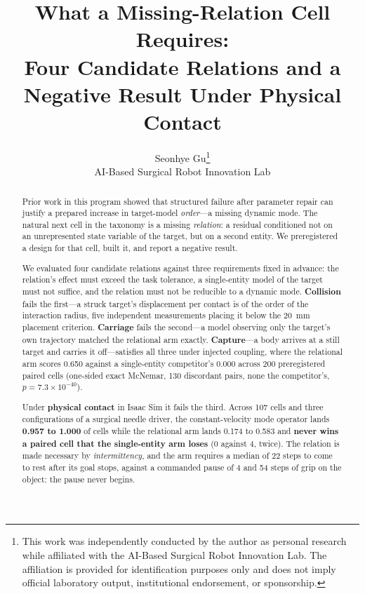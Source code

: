 \documentclass[10pt]{article}
\title{What a Missing-Relation Cell Requires:\\Four Candidate Relations and a Negative Result Under Physical Contact}
\author{Seonhye Gu\thanks{This work was independently conducted by the author as personal research while affiliated with the AI-Based Surgical Robot Innovation Lab. The affiliation is provided for identification purposes only and does not imply official laboratory output, institutional endorsement, or sponsorship.}\\
\small AI-Based Surgical Robot Innovation Lab}
\date{}
\newif\ifdraftnote
\begin{document}
\maketitle

\ifdraftnote
\begin{center}
\fbox{\parbox{0.92\textwidth}{\small\textbf{Draft note, not for submission.} The
bibliography has not been verified against published records. No confirmatory run
was performed: all physical evidence is calibration, and the preregistration
excludes calibration from confirmatory estimates. Section~\ref{sec:notclaimed}
states precisely which claims this record does and does not support. Remove this
box by setting \texttt{\textbackslash draftnotefalse}.}}
\end{center}
\fi

\begin{abstract}
Prior work in this program showed that structured failure after parameter repair
can justify a prepared increase in target-model \emph{order}---a missing dynamic
mode. The natural next cell in the taxonomy is a missing \emph{relation}: a
residual conditioned not on an unrepresented state variable of the target, but on
a second entity. We preregistered a design for that cell, built it, and report a
negative result.

We evaluated four candidate relations against three requirements fixed in
advance: the relation's effect must exceed the task tolerance, a single-entity
model of the target must not suffice, and the relation must not be reducible to a
dynamic mode. \textbf{Collision} fails the first---a struck target's displacement
per contact is of the order of the interaction radius, five independent
measurements placing it below the 20~mm placement criterion. \textbf{Carriage}
fails the second---a model observing only the target's own trajectory matched the
relational arm exactly. \textbf{Capture}---a body arrives at a still target and
carries it off---satisfies all three under injected coupling, where the
relational arm scores 0.650 against a single-entity competitor's 0.000 across 200
preregistered paired cells (one-sided exact McNemar, 130 discordant pairs, none
the competitor's, \(p = 7.3 \times 10^{-40}\)).

Under \textbf{physical contact} in Isaac Sim it fails the third. Across 107 cells
and three configurations of a surgical needle driver, the constant-velocity mode
operator lands \textbf{0.957 to 1.000} of cells while the relational arm lands
0.174 to 0.583 and \textbf{never wins a paired cell that the single-entity arm
loses} (0 against 4, twice). The relation is made necessary by
\emph{intermittency}, and the arm requires a median of 22 steps to come to rest
after its goal stops, against a commanded pause of 4 and 54 steps of grip on the
object: the pause never begins.


\end{abstract}
\end{document}
